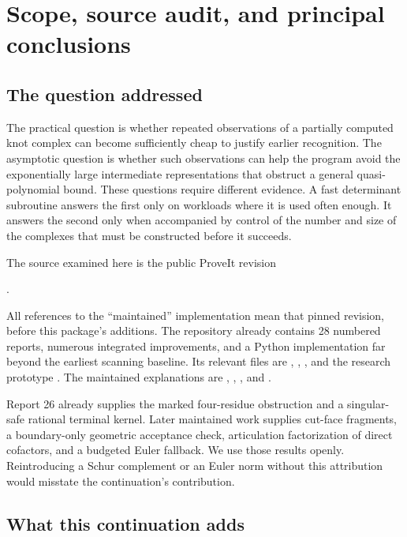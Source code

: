 \section{Scope, source audit, and principal conclusions}
\label{sec:context}

\subsection{The question addressed}

The practical question is whether repeated observations of a partially computed
knot complex can become sufficiently cheap to justify earlier recognition.
The asymptotic question is whether such observations can help the program avoid
the exponentially large intermediate representations that obstruct a general
quasi-polynomial bound. These questions require different evidence. A fast
determinant subroutine answers the first only on workloads where it is used
often enough. It answers the second only when accompanied by control of the
number and size of the complexes that must be constructed before it succeeds.

The source examined here is the public ProveIt revision
\begin{center}\basecommit.\end{center}
All references to the ``maintained'' implementation mean that pinned revision,
before this package's additions. The repository already contains 28 numbered
reports, numerous integrated improvements, and a Python implementation far
beyond the earliest scanning baseline. Its relevant files are
,
,
, and the research prototype
.
The maintained explanations are
,
,
, and
 \cite{proveit}.

Report 26 already supplies the marked four-residue obstruction and a
singular-safe rational terminal kernel. Later maintained work supplies cut-face
fragments, a boundary-only geometric acceptance check, articulation factorization
of direct cofactors, and a budgeted Euler fallback. We use those results openly.
Reintroducing a Schur complement or an Euler norm without this attribution would
misstate the continuation's contribution.

\subsection{What this continuation adds}

